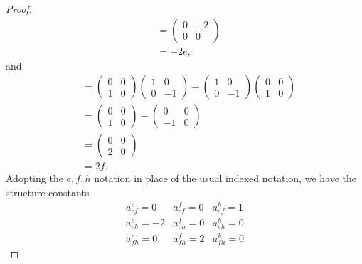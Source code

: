 \documentclass[12pt]{article}
\theoremstyle{definition}
\begin{document}
\begin{proof}
\begin{align*}
		       & = \begin{pmatrix} 0 & -2 \\ 0 & 0 \end{pmatrix}                                                                                                                                         \\
		       & = -2e,
	\end{align*}
	and \begin{align*}
		[f, h] & = \begin{pmatrix} 0 & 0 \\ 1 & 0 \end{pmatrix}\begin{pmatrix}1 & 0 \\ 0 & -1 \end{pmatrix} - \begin{pmatrix} 1 & 0 \\ 0 & -1 \end{pmatrix} \begin{pmatrix} 0 & 0 \\ 1 & 0 \end{pmatrix} \\
		       & = \begin{pmatrix} 0 & 0 \\ 1 & 0 \end{pmatrix} - \begin{pmatrix} 0 & 0 \\ -1 & 0 \end{pmatrix}                                                                                          \\
		       & = \begin{pmatrix} 0 & 0 \\ 2 & 0 \end{pmatrix}                                                                                                                                          \\
		       & = 2f.
	\end{align*}
	Adopting the $e, f, h$ notation in place of the usual indexed notation, we have the structure constants \begin{equation*}
		\begin{array}{ccc}
			a_{ef}^e = 0  & a_{ef}^f = 0 & a_{ef}^h = 1 \\
			a_{eh}^e = -2 & a_{eh}^f = 0 & a_{eh}^h = 0 \\
			a_{fh}^e = 0  & a_{fh}^f = 2 & a_{fh}^h = 0
		\end{array}
	\end{equation*}
\end{proof}
\end{document}
